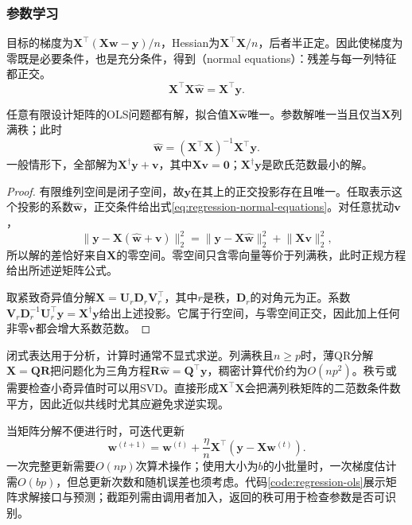 \subsubsection{参数学习}
\label{sec:regression-ols-learning}

目标的梯度为$\bm{X}^{\top}(\bm{X}\bm{w}-\bm{y})/n$，Hessian为$\bm{X}^{\top}\bm{X}/n$，后者半正定。因此使梯度为零既是必要条件，也是充分条件，得到（normal equations）：残差与每一列特征都正交。
\begin{equation}
  \bm{X}^{\top}\bm{X}\widehat{\bm{w}}=\bm{X}^{\top}\bm{y}.
  \label{eq:regression-normal-equations}
\end{equation}

\begin{theorem}[最小二乘解的存在与唯一性]
  \label{thm:regression-ols-solutions}
  任意有限设计矩阵的OLS问题都有解，拟合值$\bm{X}\widehat{\bm{w}}$唯一。参数解唯一当且仅当$\bm{X}$列满秩；此时
  \[
    \widehat{\bm{w}}=(\bm{X}^{\top}\bm{X})^{-1}\bm{X}^{\top}\bm{y}.
  \]
  一般情形下，全部解为$\bm{X}^{\dagger}\bm{y}+\bm{v}$，其中$\bm{X}\bm{v}=\bm{0}$；$\bm{X}^{\dagger}\bm{y}$是欧氏范数最小的解。
\end{theorem}

\begin{proof}
有限维列空间是闭子空间，故$\bm{y}$在其上的正交投影存在且唯一。任取表示这个投影的系数$\widehat{\bm{w}}$，正交条件给出式\eqref{eq:regression-normal-equations}。对任意扰动$\bm{v}$，
\[
  \lVert\bm{y}-\bm{X}(\widehat{\bm{w}}+\bm{v})\rVert_2^2
  =\lVert\bm{y}-\bm{X}\widehat{\bm{w}}\rVert_2^2
    +\lVert\bm{X}\bm{v}\rVert_2^2,
\]
所以解的差恰好来自$\bm{X}$的零空间。零空间只含零向量等价于列满秩，此时正规方程给出所述逆矩阵公式。

取紧致奇异值分解$\bm{X}=\bm{U}_r\bm{D}_r\bm{V}_r^{\top}$，其中$r$是秩，$\bm{D}_r$的对角元为正。系数$\bm{V}_r\bm{D}_r^{-1}\bm{U}_r^{\top}\bm{y}=\bm{X}^{\dagger}\bm{y}$给出上述投影。它属于行空间，与零空间正交，因此加上任何非零$\bm{v}$都会增大系数范数。
\end{proof}

闭式表达用于分析，计算时通常不显式求逆。列满秩且$n\geq p$时，薄QR分解$\bm{X}=\bm{Q}\bm{R}$把问题化为三角方程$\bm{R}\widehat{\bm{w}}=\bm{Q}^{\top}\bm{y}$，稠密计算代价约为$O(np^2)$。秩亏或需要检查小奇异值时可以用SVD。直接形成$\bm{X}^{\top}\bm{X}$会把满列秩矩阵的二范数条件数平方，因此近似共线时尤其应避免求逆实现。

当矩阵分解不便进行时，可迭代更新
\begin{equation}
  \bm{w}^{(t+1)}
  =\bm{w}^{(t)}+\frac{\eta}{n}
       \bm{X}^{\top}(\bm{y}-\bm{X}\bm{w}^{(t)}).
  \label{eq:regression-ols-gradient}
\end{equation}
一次完整更新需要$O(np)$次算术操作；使用大小为$b$的小批量时，一次梯度估计需$O(bp)$，但总更新次数和随机误差也须考虑。代码\ref{code:regression-ols}展示矩阵求解接口与预测；截距列需由调用者加入，返回的秩可用于检查参数是否可识别。

